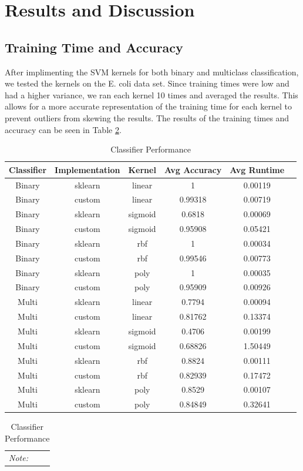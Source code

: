 \documentclass[12pt]{article}
\begin{document}
\section{Results and Discussion}
\subsection{Training Time and Accuracy}
After implimenting the SVM kernels for both binary and multiclass classification, we tested the kernels on the E. coli data set.
Since training times were low and had a higher variance, we ran each kernel 10 times and averaged the results.
This allows for a more accurate representation of the training time for each kernel to prevent outliers from skewing the results.
The results of the training times and accuracy can be seen in Table \ref{tab:classifier_performance}.
\begin{table}[h]
    \centering
    \caption{Classifier Performance}
    \label{tab:classifier_performance}
    \begin{tabular}{cccccc}
        \toprule
        \textbf{Classifier} & \textbf{Implementation} & \textbf{Kernel} & \textbf{Avg Accuracy} & \textbf{Avg Runtime} \\
        \midrule
        Binary & sklearn & linear & 1 & 0.00119 \\
        Binary & custom & linear & 0.99318 & 0.00719 \\
        Binary & sklearn & sigmoid & 0.6818 & 0.00069 \\
        Binary & custom & sigmoid & 0.95908 & 0.05421 \\
        Binary & sklearn & rbf & 1 & 0.00034 \\
        Binary & custom & rbf & 0.99546 & 0.00773 \\
        Binary & sklearn & poly & 1 & 0.00035 \\
        Binary & custom & poly & 0.95909 & 0.00926 \\
        Multi & sklearn & linear & 0.7794 & 0.00094 \\
        Multi & custom & linear & 0.81762 & 0.13374 \\
        Multi & sklearn & sigmoid & 0.4706 & 0.00199 \\
        Multi & custom & sigmoid & 0.68826 & 1.50449 \\
        Multi & sklearn & rbf & 0.8824 & 0.00111 \\
        Multi & custom & rbf & 0.82939 & 0.17472 \\
        Multi & sklearn & poly & 0.8529 & 0.00107 \\
        Multi & custom & poly & 0.84849 & 0.32641 \\
        \bottomrule
    \end{tabular}
    \vspace{1em}  %
    \begin{tabular}{p{}}  %
        \multicolumn{1}{l}{\textit{Note:}} These times were calculated with 10 runs for each kernel and averaged. \\
    \end{tabular}
\end{table}
\end{document}
